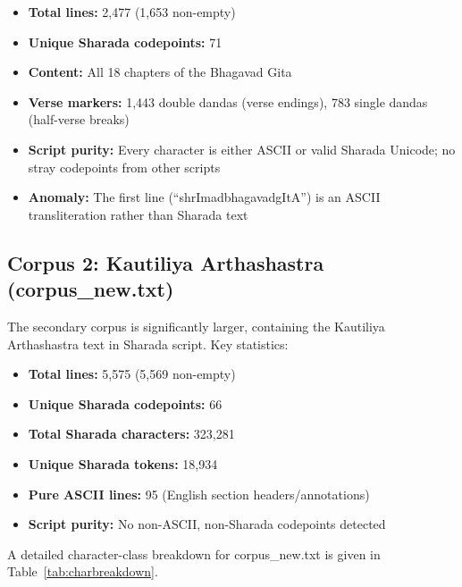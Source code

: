 \documentclass[11pt]{article}
\begin{document}
\begin{itemize}
    \item \textbf{Total lines:} 2,477 (1,653 non-empty)
    \item \textbf{Unique Sharada codepoints:} 71
    \item \textbf{Content:} All 18 chapters of the Bhagavad Gita
    \item \textbf{Verse markers:} 1,443 double dandas (verse endings), 783 single dandas (half-verse breaks)
    \item \textbf{Script purity:} Every character is either ASCII or valid Sharada Unicode; no stray codepoints from other scripts
    \item \textbf{Anomaly:} The first line (``shrImadbhagavadgItA'') is an ASCII transliteration rather than Sharada text
\end{itemize}

\subsection{Corpus 2: Kautiliya Arthashastra (corpus\_new.txt)}
The secondary corpus is significantly larger, containing the Kautiliya Arthashastra text in Sharada script. Key statistics:

\begin{itemize}
    \item \textbf{Total lines:} 5,575 (5,569 non-empty)
    \item \textbf{Unique Sharada codepoints:} 66
    \item \textbf{Total Sharada characters:} 323,281
    \item \textbf{Unique Sharada tokens:} 18,934
    \item \textbf{Pure ASCII lines:} 95 (English section headers/annotations)
    \item \textbf{Script purity:} No non-ASCII, non-Sharada codepoints detected
\end{itemize}

A detailed character-class breakdown for corpus\_new.txt is given in Table~\ref{tab:charbreakdown}.
\end{document}
